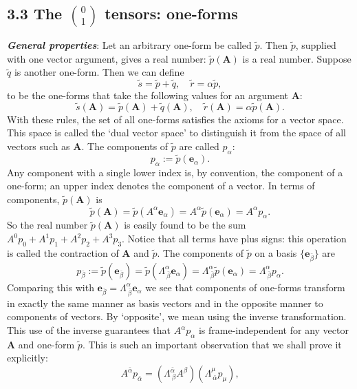 \documentclass[12pt]{book}
\begin{document}
    \subsection{3.3 The \(\binom{0}{1}\) tensors: one-forms}

    \textit{\textbf{General properties}}: Let an arbitrary one-form be called \(\tilde{p}\). Then \(\tilde{p}\), supplied with one vector argument, gives a real number: \(\tilde{p}(\mathbf{A})\) is a real number. Suppose \(\tilde{q}\) is another one-form. Then we can define
    \[
    \tilde{s} = \tilde{p} + \tilde{q}, \quad \tilde{r} = \alpha \tilde{p},
    \]
    to be the one-forms that take the following values for an argument \(\mathbf{A}\):
    \[
    \tilde{s}(\mathbf{A}) = \tilde{p}(\mathbf{A}) + \tilde{q}(\mathbf{A}), \quad \tilde{r}(\mathbf{A}) = \alpha \tilde{p}(\mathbf{A}).
    \]
    With these rules, the set of all one-forms satisfies the axioms for a vector space. This space is called the ‘dual vector space’ to distinguish it from the space of all vectors such as \(\mathbf{A}\).
    The components of \(\tilde{p}\) are called \(p_\alpha\):
    \[
    p_\alpha := \tilde{p}(\mathbf{e}_\alpha). \tag{3.7}
    \]
    Any component with a single lower index is, by convention, the component of a one-form; an upper index denotes the component of a vector. In terms of components, \(\tilde{p}(\mathbf{A})\) is
    \[
    \tilde{p}(\mathbf{A}) = \tilde{p}(A^\alpha \mathbf{e}_\alpha)
    = A^\alpha \tilde{p}(\mathbf{e}_\alpha)= A^\alpha p_\alpha. \tag{3.8}
    \]
    So the real number \(\tilde{p}(\mathbf{A})\) is easily found to be the sum \(A^0p_0 + A^1p_1 + A^2p_2 + A^3p_3\). Notice that all terms have plus signs: this operation is called the contraction of \(\mathbf{A}\) and \(\tilde{p}\). The components of \(\tilde{p}\) on a basis \(\{\mathbf{e}_{\bar{\beta}}\}\) are
    \[
    p_{\bar{\beta}} := \tilde{p}(\mathbf{e}_{\bar{\beta}}) = \tilde{p}(\Lambda^\alpha_{\ \bar{\beta}} \mathbf{e}_\alpha)
    = \Lambda^\alpha_{\ \bar{\beta}} \tilde{p}(\mathbf{e}_\alpha) = \Lambda^\alpha_{\ \bar{\beta}} p_\alpha. \tag{3.9}
    \]
    Comparing this with  \(\mathbf{e}_{\bar{\beta}} = \Lambda^\alpha_{\ \bar{\beta}} \mathbf{e}_\alpha\) we see that components of one-forms transform in exactly the same manner as basis vectors and in the opposite manner to components of vectors. By ‘opposite’, we mean using the inverse transformation. This use of the inverse guarantees that \(A^\alpha p_\alpha\) is frame-independent for any vector \(\mathbf{A}\) and one-form \(\tilde{p}\). This is such an important observation that we shall prove it explicitly:    \[
    A^{\bar{\alpha}} p_{\bar{\alpha}} = (\Lambda^{\bar{\alpha}}_{\ \beta} A^\beta)(\Lambda^\mu_{\ \bar{\alpha}} p_\mu), \tag{3.10a}
    \]
\end{document}
